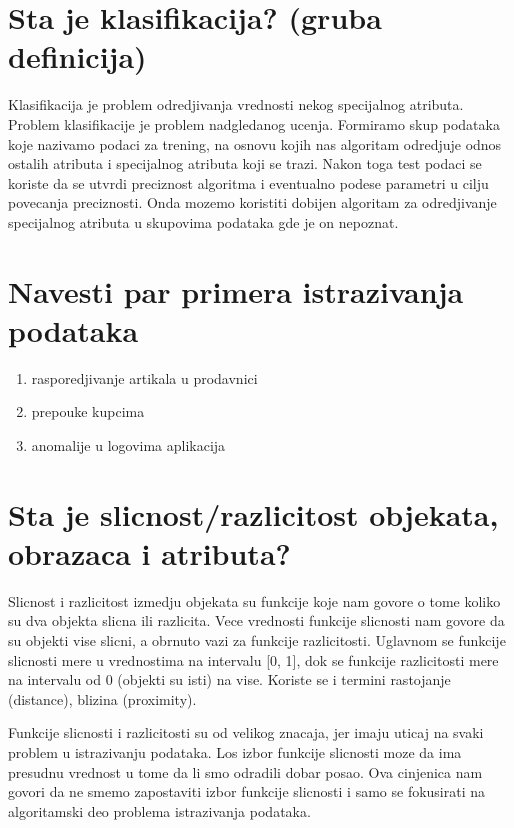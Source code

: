 \documentclass[a4paper]{article}
\begin{document}
\section{Sta je klasifikacija? (gruba definicija)}

Klasifikacija je problem odredjivanja vrednosti nekog specijalnog atributa. Problem klasifikacije je
problem nadgledanog ucenja. Formiramo skup podataka koje nazivamo  podaci za trening, na osnovu
kojih nas algoritam odredjuje odnos ostalih atributa i specijalnog atributa koji se trazi. Nakon
toga test podaci se koriste da se utvrdi preciznost algoritma i eventualno podese parametri u cilju
povecanja preciznosti. Onda mozemo koristiti dobijen algoritam za odredjivanje specijalnog atributa
u skupovima podataka gde je on nepoznat.

\section{Navesti par primera istrazivanja podataka}

\begin{enumerate}
    \item rasporedjivanje artikala u prodavnici
    \item prepouke kupcima
    \item anomalije u logovima aplikacija
\end{enumerate}

\section{Sta je slicnost/razlicitost objekata, obrazaca i atributa?}

Slicnost i razlicitost izmedju objekata su funkcije koje nam govore o tome koliko su dva objekta
slicna ili razlicita. Vece vrednosti funkcije slicnosti nam govore da su objekti vise slicni, a
obrnuto vazi za funkcije razlicitosti.  Uglavnom se funkcije slicnosti mere u vrednostima na
intervalu [0, 1], dok se funkcije razlicitosti mere na intervalu od 0 (objekti su isti) na vise.
Koriste se i termini rastojanje (distance), blizina (proximity).

Funkcije slicnosti i razlicitosti su od velikog znacaja, jer imaju uticaj na svaki problem u
istrazivanju podataka. Los izbor funkcije slicnosti moze da ima presudnu vrednost u tome da li smo
odradili dobar posao. Ova cinjenica nam govori da ne smemo zapostaviti izbor funkcije slicnosti i
samo se fokusirati na algoritamski deo problema istrazivanja podataka.
\end{document}
